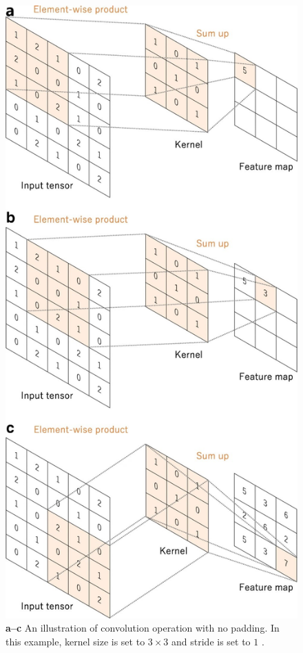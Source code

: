 \begin{figure}[H]
        \begin{center}
	    \includegraphics[scale=0.40]{images/Fundamentals/Convolution.JPG}
	    \caption[An illustration of Convolution Operation.]{\textbf{a–c} An illustration of convolution operation with no padding. In this example, kernel size is set to $3 \times 3$ and stride is set to $1$ \cite{articleCNNs}.}
	    
	    \label{fig:Convolution}
	    \end{center}
\end{figure}


